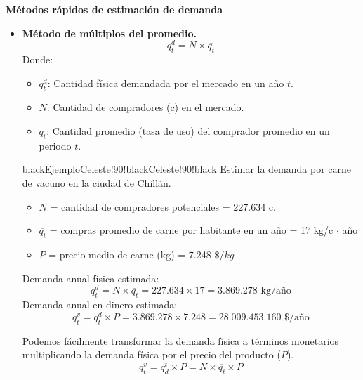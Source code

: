 \documentclass{templateNote}
\newcommand{\newparagraph}{\par\vspace{\baselineskip}\noindent}
\begin{document}
\textbf{Métodos rápidos de estimación de demanda}
\newparagraph
\begin{itemize}
  \item \textbf{Método de múltiplos del promedio.}
  \begin{equation*}
    q_t^d = N \times \overline{q_t}
  \end{equation*}
  Donde:
  \begin{itemize}
    \item $q_t^d$: Cantidad física demandada por el mercado en un año $t$.
    \item $N$: Cantidad de compradores (c) en el mercado.
    \item $\overline{q_t}$: Cantidad promedio (tasa de uso) del comprador promedio en un periodo $t$.
  \end{itemize}
  \begin{CuadroPersonalizado}{black}{Ejemplo}{Celeste!90!black}{Celeste!90!black}
    Estimar la demanda por carne de vacuno en la ciudad de Chillán.
    \begin{itemize}
      \item $N$ = cantidad de compradores potenciales = 227.634 c.
      \item $\overline{q_t}$ = compras promedio de carne por habitante en un año = 17 kg/c $\cdot$ año
      \item $P$ = precio medio de carne (kg) = 7.248 $\$/kg$
    \end{itemize}
    Demanda anual física estimada:
    \begin{equation*}
      q_t^d = N \times \overline{q_t} = 227.634 \times 17 = 3.869.278 \text{ kg/año}
    \end{equation*}
    Demanda anual en dinero estimada:
    \begin{equation*}
      q_t^v = q_t^d \times P = 3.869.278 \times 7.248 = 28.009.453.160 \text{ \$/año}
    \end{equation*}
  \end{CuadroPersonalizado}
  
  Podemos fácilmente transformar la demanda física a términos monetarios multiplicando la demanda física por el precio del producto ($P$).
  \begin{equation*}
    q_t^v = q_d^t \times P = N \times \overline{q_t} \times P
  \end{equation*}


\end{itemize}
\end{document}
